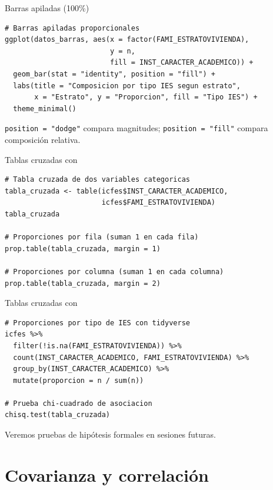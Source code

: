 \documentclass[aspectratio=169, 11pt]{beamer}
\begin{document}
\begin{frame}[fragile]{Barras apiladas (100\%)}
\begin{lstlisting}
# Barras apiladas proporcionales
ggplot(datos_barras, aes(x = factor(FAMI_ESTRATOVIVIENDA),
                         y = n,
                         fill = INST_CARACTER_ACADEMICO)) +
  geom_bar(stat = "identity", position = "fill") +
  labs(title = "Composicion por tipo IES segun estrato",
       x = "Estrato", y = "Proporcion", fill = "Tipo IES") +
  theme_minimal()
\end{lstlisting}

\texttt{position = "dodge"} compara magnitudes; \texttt{position = "fill"} compara composición relativa.
\end{frame}

\begin{frame}[fragile]{Tablas cruzadas con }
\begin{lstlisting}
# Tabla cruzada de dos variables categoricas
tabla_cruzada <- table(icfes$INST_CARACTER_ACADEMICO,
                       icfes$FAMI_ESTRATOVIVIENDA)
tabla_cruzada

# Proporciones por fila (suman 1 en cada fila)
prop.table(tabla_cruzada, margin = 1)

# Proporciones por columna (suman 1 en cada columna)
prop.table(tabla_cruzada, margin = 2)
\end{lstlisting}
\end{frame}

\begin{frame}[fragile]{Tablas cruzadas con }
\begin{lstlisting}
# Proporciones por tipo de IES con tidyverse
icfes %>%
  filter(!is.na(FAMI_ESTRATOVIVIENDA)) %>%
  count(INST_CARACTER_ACADEMICO, FAMI_ESTRATOVIVIENDA) %>%
  group_by(INST_CARACTER_ACADEMICO) %>%
  mutate(proporcion = n / sum(n))

# Prueba chi-cuadrado de asociacion
chisq.test(tabla_cruzada)
\end{lstlisting}

Veremos pruebas de hipótesis formales en sesiones futuras.
\end{frame}

\section{Covarianza y correlación}
\end{document}
